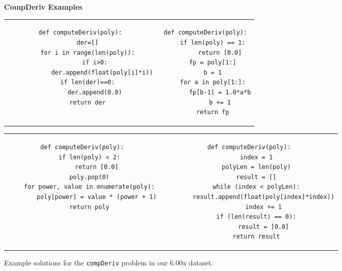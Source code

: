 \documentclass[12pt,twoside]{mitthesis}
\newcommand \codevar[1]{\texttt{#1}}
\begin{document}
\begin{figure}
{\bf CompDeriv Examples}\\
\begin{tabular}{cc} 
\begin{minipage}{0.5\linewidth}
\begin{lstlisting}[]
def computeDeriv(poly):
    der=[]
    for i in range(len(poly)):
        if i>0:
            der.append(float(poly[i]*i))
    if len(der)==0:
        der.append(0.0)
    return der

\end{lstlisting}
\end{minipage}
&
\begin{minipage}{0.5\linewidth}
\begin{lstlisting}[]
def computeDeriv(poly):
    if len(poly) == 1:
        return [0.0]
    fp = poly[1:]
    b = 1
    for a in poly[1:]:
        fp[b-1] = 1.0*a*b
        b += 1
    return fp
\end{lstlisting}
\end{minipage}
\\
\end{tabular}
\begin{tabular}{c c}
\begin{minipage}{0.4\linewidth}
\begin{lstlisting}[]
def computeDeriv(poly):
    if len(poly) < 2:
        return [0.0]
    poly.pop(0)
    for power, value in enumerate(poly):
        poly[power] = value * (power + 1)
    return poly
\end{lstlisting}
\end{minipage}
&
\begin{minipage}{0.4\linewidth}
\begin{lstlisting}[]
def computeDeriv(poly):
    index = 1
    polyLen = len(poly)
    result = []
    while (index < polyLen):
        result.append(float(poly[index]*index))
        index += 1
    if (len(result) == 0):
        result = [0.0]
    return result
\end{lstlisting}
\end{minipage}

\end{tabular}
\caption{Example solutions for the \codevar{compDeriv} problem in our 6.00x dataset.}
\label{cdexamples}
\end{figure}
\end{document}
